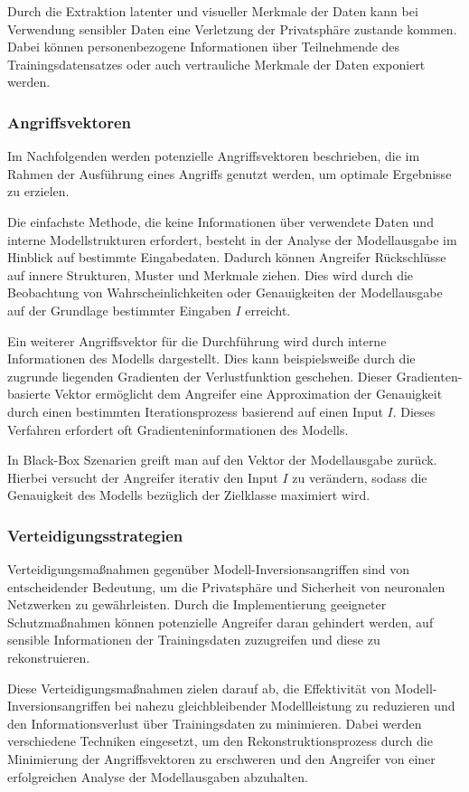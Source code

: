 Durch die Extraktion latenter und visueller Merkmale der Daten kann bei Verwendung sensibler Daten eine Verletzung der Privatsphäre zustande kommen. Dabei können personenbezogene Informationen über Teilnehmende des Trainingsdatensatzes oder auch vertrauliche Merkmale der Daten exponiert werden.
\subsubsection{Angriffsvektoren}
Im Nachfolgenden werden potenzielle Angriffsvektoren beschrieben, die im Rahmen der Ausführung eines Angriffs genutzt werden, um optimale Ergebnisse zu erzielen.

Die einfachste Methode, die keine Informationen über verwendete Daten und interne Modellstrukturen erfordert, besteht in der Analyse der Modellausgabe im Hinblick auf bestimmte Eingabedaten. Dadurch können Angreifer Rückschlüsse auf innere Strukturen, Muster und Merkmale ziehen. Dies wird durch die Beobachtung von Wahrscheinlichkeiten oder Genauigkeiten der Modellausgabe auf der Grundlage bestimmter Eingaben $I$ erreicht.

Ein weiterer Angriffsvektor für die Durchführung wird durch interne Informationen des Modells dargestellt. Dies kann beispielsweiße durch die zugrunde liegenden Gradienten der Verlustfunktion geschehen. Dieser Gradienten-basierte Vektor ermöglicht dem Angreifer eine Approximation der Genauigkeit durch einen bestimmten Iterationsprozess basierend auf einen Input $I$. Dieses Verfahren erfordert oft Gradienteninformationen des Modells. 

In Black-Box Szenarien greift man auf den Vektor der Modellausgabe zurück. Hierbei versucht der Angreifer iterativ den Input $I$ zu verändern, sodass die Genauigkeit des Modells bezüglich der Zielklasse maximiert wird. 
\subsubsection{Verteidigungsstrategien}{\label{diff_privacy}}
Verteidigungsmaßnahmen gegenüber Modell-Inversionsangriffen sind von entscheidender Bedeutung, um die Privatsphäre und Sicherheit von neuronalen Netzwerken zu gewährleisten. Durch die Implementierung geeigneter Schutzmaßnahmen können potenzielle Angreifer daran gehindert werden, auf sensible Informationen der Trainingsdaten zuzugreifen und diese zu rekonstruieren.

Diese Verteidigungsmaßnahmen zielen darauf ab, die Effektivität von Modell-Inversionsangriffen bei nahezu gleichbleibender Modellleistung zu reduzieren und den Informationsverlust über Trainingsdaten zu minimieren. Dabei werden verschiedene Techniken eingesetzt, um den Rekonstruktionsprozess durch die Minimierung der Angriffsvektoren zu erschweren und den Angreifer von einer erfolgreichen Analyse der Modellausgaben abzuhalten.

